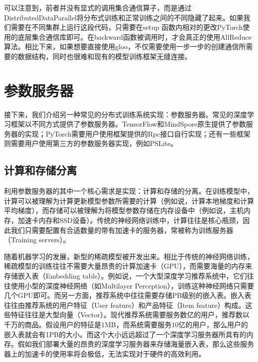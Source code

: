 \documentclass[letterpaper,10pt,english]{sphinxmanual}
\begin{document}
\sphinxAtStartPar
可以注意到，前者并没有显式的调用集合通信算子，而是通过DistributedDataParallel将分布式训练和正常训练之间的不同隐藏了起来。如果我们需要在不同集群上运行这段代码，只需要在setup
函数内相对的更改PyTorch使用的底层集合通信库即可。在backward函数被调用时，才会真正的使用AllReduce算法。相比下来，如果想要直接使用gloo，不仅需要使用一步一步的创建通信所需要的数据结构，同时也很难和现有的模型训练框架无缝连接。


\section{参数服务器}
\label{\detokenize{chapter_distributed_training/parameter_servers:id1}}\label{\detokenize{chapter_distributed_training/parameter_servers::doc}}
\sphinxAtStartPar
接下来，我们介绍另一种常见的分布式训练系统实现：参数服务器。常见的深度学习框架以不同方式提供了参数服务器。TensorFlow和MindSpore原生提供了参数服务器的实现；PyTorch需要用户使用框架提供的Rpc接口自行实现；还有一些框架则需要用户使用第三方的参数服务器实现，例如PS\sphinxhyphen{}Lite。


\subsection{计算和存储分离}
\label{\detokenize{chapter_distributed_training/parameter_servers:id2}}
\sphinxAtStartPar
利用参数服务器的其中一个核心需求是实现：计算和存储的分离。在训练模型中，计算可以被理解为计算更新模型参数所需要的计算（例如说，计算本地梯度和计算平均梯度），而存储可以被理解为将模型参数存储在内存设备中（例如说，主机内存，加速卡内存和SSD设备）。传统的神经网络训练中，计算往往是核心瓶颈，因此我们只需要配置有合适数量的带有加速卡的服务器，常被称为训练服务器（Training
servers）。

\sphinxAtStartPar
随着机器学习的发展，新型的稀疏模型被开发出来。相比于传统的神经网络训练，稀疏模型的训练往往不需要大量昂贵的计算加速卡（GPU），而需要海量的内存来存储嵌入表（Embedding
table）。例如说，一个大型深度学习推荐系统中，它们往往使用小型的深度神经网络（如Multi\sphinxhyphen{}layer
Perception），训练这种神经网络只需要几个GPU即可。而另一方面，推荐系统中往往需要存储PB级别的嵌入表。嵌入表往往由推荐系统的用户特征（User
feature）和产品特征（Item
feature）构成。这些特征往往是大型向量（Vector）。现代推荐系统需要服务数亿的用户，推荐数以千万的商品。假设用户的特征是1MB，而系统需要服务10亿的用户，那么用户的嵌入表就会有1PB的大小。而这个大小远远超过了一个深度学习服务器所具有的内存。假如我们部署大量的昂贵的深度学习服务器来存储海量嵌入表，那么这些服务器上的加速卡的使用率将会极低，无法实现对于硬件的高效利用。
\end{document}
